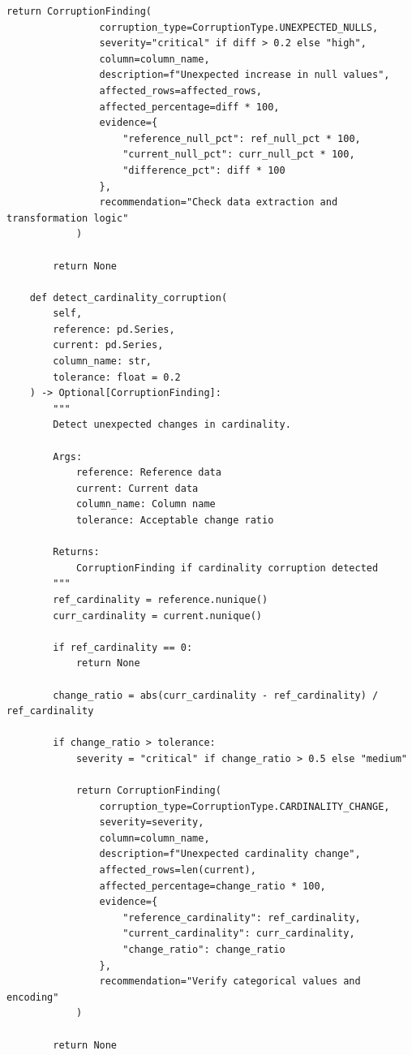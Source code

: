 \begin{lstlisting}[style=python, caption={Data corruption detection framework}]
            return CorruptionFinding(
                corruption_type=CorruptionType.UNEXPECTED_NULLS,
                severity="critical" if diff > 0.2 else "high",
                column=column_name,
                description=f"Unexpected increase in null values",
                affected_rows=affected_rows,
                affected_percentage=diff * 100,
                evidence={
                    "reference_null_pct": ref_null_pct * 100,
                    "current_null_pct": curr_null_pct * 100,
                    "difference_pct": diff * 100
                },
                recommendation="Check data extraction and transformation logic"
            )

        return None

    def detect_cardinality_corruption(
        self,
        reference: pd.Series,
        current: pd.Series,
        column_name: str,
        tolerance: float = 0.2
    ) -> Optional[CorruptionFinding]:
        """
        Detect unexpected changes in cardinality.

        Args:
            reference: Reference data
            current: Current data
            column_name: Column name
            tolerance: Acceptable change ratio

        Returns:
            CorruptionFinding if cardinality corruption detected
        """
        ref_cardinality = reference.nunique()
        curr_cardinality = current.nunique()

        if ref_cardinality == 0:
            return None

        change_ratio = abs(curr_cardinality - ref_cardinality) / ref_cardinality

        if change_ratio > tolerance:
            severity = "critical" if change_ratio > 0.5 else "medium"

            return CorruptionFinding(
                corruption_type=CorruptionType.CARDINALITY_CHANGE,
                severity=severity,
                column=column_name,
                description=f"Unexpected cardinality change",
                affected_rows=len(current),
                affected_percentage=change_ratio * 100,
                evidence={
                    "reference_cardinality": ref_cardinality,
                    "current_cardinality": curr_cardinality,
                    "change_ratio": change_ratio
                },
                recommendation="Verify categorical values and encoding"
            )

        return None


\end{lstlisting}

